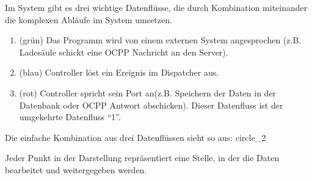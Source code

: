 Im System gibt es drei wichtige Datenflüsse, die durch Kombination miteinander die komplexen Abläufe im System umsetzen.
\begin{enumerate}
    \item (grün) Das Programm wird von einem externen System angesprochen (z.B. Ladesäule schickt eine OCPP Nachricht an den Server).
    \item (blau) Controller löst ein Ereignis im Dispatcher aus.
    \item (rot) Controller spricht sein Port an(z.B. Speichern der Daten in der Datenbank oder OCPP Antwort abschicken). Dieser Datenfluss ist der umgekehrte Datenfluss ``1''.
\end{enumerate}
Die einfache Kombination aus drei Datenflüssen sieht so aus:
{circle_2}

Jeder Punkt in der Darstellung repräsentiert eine Stelle, in der die Daten bearbeitet und weitergegeben werden.
